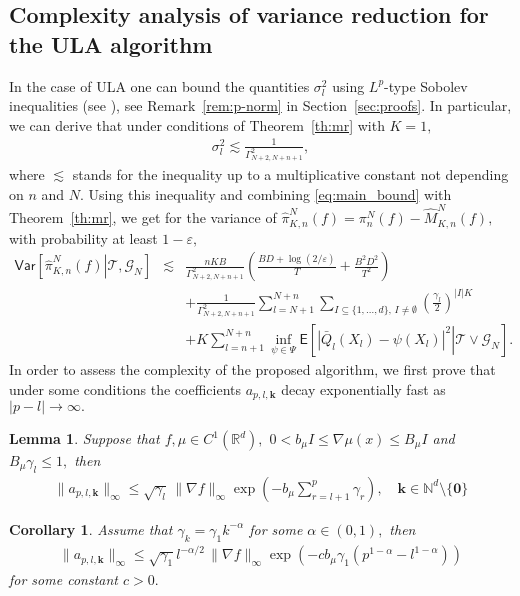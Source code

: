 \documentclass[aap,preprint]{imsart}
\def\NtrainPath{T}
\def\TrainSet{\mathcal{T}}
\newtheorem{lem}[thm]{Lemma}
\newtheorem{cor}{Corollary}
\begin{document}
\subsection{Complexity analysis of variance reduction for the ULA algorithm}
In the case of ULA one can bound the quantities \(\sigma_l^2\) using  \(L^p\)-type Sobolev inequalities  (see \cite{Adamczak}), see Remark~\ref{rem:p-norm} in Section~\ref{sec:proofs}. 
In particular, we can derive that  under conditions of Theorem~\ref{th:mr} with \(K=1,\)
\begin{eqnarray*}
\sigma_l^2\lesssim \frac{1}{\Gamma^2_{N+2,N+n+1}},
\end{eqnarray*}
where \(\lesssim \) stands for the inequality up to a multiplicative constant not depending on \(n\) and \(N.\) Using this inequality and combining \eqref{eq:main_bound} with Theorem~\ref{th:mr}, we get for the variance of \(\widehat \pi_{K,n}^N(f)=\pi_n^N(f)-\widehat M_{K,n}^N(f),\) with probability at least \(1-\varepsilon,\)
\begin{eqnarray}
\nonumber
\mathsf{Var}\left[\left.\widehat \pi_{K,n}^N(f)\right | \TrainSet, \mathcal{G}_N\right]&\lesssim & \frac{n KB}{\Gamma^2_{N+2,N+n+1}}
\left(\frac{BD+\log(2/\varepsilon)}{\NtrainPath}+\frac{B^2D^2}{\NtrainPath^2}\right)
\\
\nonumber
&& + \frac{1}{\Gamma^2_{N+2,N+n+1}}\sum_{l=N+1}^{N+n}\sum_{I\subseteq\{1,\ldots,d\},\, I\neq \emptyset}
\left(\frac{\gamma_{l}}{2}\right)^{|I|K}
\\
\label{eq:ula_red_var}
&& +
K \sum_{l=n+1}^{N+n}\inf_{\psi\in \Psi}
\mathsf{E}\left[\left.\left|\bar Q_l(X_{l})-\psi(X_{l})\right|^{2}\right | \TrainSet \vee \mathcal{G}_N \right].
\end{eqnarray}
In order to assess the complexity of the proposed algorithm,  we first prove that under some conditions the coefficients \(a_{p,l,\mathbf{k}}\) decay exponentially fast as \(|p-l|\to \infty.\)
\begin{lem}
\label{a_decay}
Suppose that \(f,\mu\in C^1(\mathbb{R}^d),\) \(0<b_\mu I\leq \nabla \mu(x)\leq B_\mu I\) and \(B_\mu\gamma_{l}\leq 1,\) then
\begin{eqnarray*}
\|a_{p,l,\mathbf{k}}\|_{\infty}\leq \sqrt{\gamma_l}\, \|\nabla f\|_\infty\exp\left(-b_{\mu}\sum_{r=l+1}^p \gamma_{r}  \right),\quad \mathbf{k}\in \mathbb{N}^d\setminus \{\mathbf{0}\}
\end{eqnarray*}
\end{lem}
\begin{cor}
Assume that \(\gamma_k=\gamma_1 k^{-\alpha}\) for some \(\alpha\in (0,1),\) then
\begin{eqnarray*}
\|a_{p,l,\mathbf{k}}\|_{\infty}\leq \sqrt{\gamma_1} l^{-\alpha/2}\, \|\nabla f\|_\infty\exp\left(-c b_{\mu}\gamma_1 (p^{1-\alpha}-l^{1-\alpha}) \right)
\end{eqnarray*}
for some constant \(c>0.\)
\end{cor}
\end{document}
